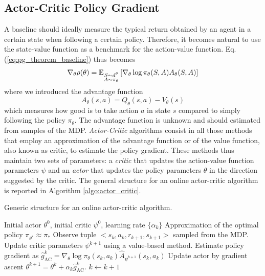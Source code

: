 \subsection{Actor-Critic Policy Gradient}
A baseline should ideally measure the typical return obtained by an agent in a certain state when following a certain policy. Therefore, it becomes natural to use the state-value function as a benchmark for the action-value function. Eq. (\ref{eq:pg_theorem_baseline}) thus becomes
\begin{equation}
\label{eq:actor_critic_pg}
	\nabla_\theta \rho(\theta) =
		\E[\substack{S \sim d^\theta\\A \sim \pi_\theta}]{\nabla_\theta\log
		\pi_\theta(S,A) A_\theta(S,A)}
\end{equation} 
where we introduced the advantage function
\begin{equation}
	A_\theta(s,a) = Q_\theta(s,a) - V_\theta(s)
\end{equation}
which measures how good is to take action $a$ in state $s$ compared to simply following the policy $\pi_\theta$. The advantage function is unknown and should estimated from samples of the MDP. \emph{Actor-Critic} algorithms consist in all those methods that employ an approximation of the advantage function or of the value function, also known as critic, to estimate the policy gradient. These methods thus maintain two sets of parameters: a \emph{critic} that updates the action-value function parameters $\psi$ and an \emph{actor} that updates the policy parameters $\theta$ in the direction suggested by the critic. The general structure for an online actor-critic algorithm is reported in Algorithm \ref{algo:actor_critic}.\\
\begin{algorithm}[t]
	\caption{Generic structure for an online actor-critic algorithm.}
	\label{algo:actor_critic}
	\begin{algorithmic}[1]
		\Require Initial actor $\theta^0$, initial critic $\psi^0$, learning rate $\{\alpha_k\}$
		\Ensure Approximation of the optimal policy $\pi_{\theta^*} \approx \pi_*$
		\Repeat
			\State Observe tuple $<s_k, a_k, r_{k+1}, s_{k+1}>$ sampled from the MDP.
			\State Update critic parameters $\psi^{k+1}$ using a value-based method. 
			\State Estimate policy gradient as $\widehat{g}_\text{AC}^k = \nabla_\theta \log \pi_\theta(s_k, a_k) \widehat{A}_{\psi^{k+1}}(s_k, a_k)$
			\State Update actor by gradient ascent $\theta^{k+1} = \theta^k + \alpha_k \widehat{g}_\text{AC}^k$. 
			\State $k \leftarrow k + 1$
	\end{algorithmic}
\end{algorithm}
